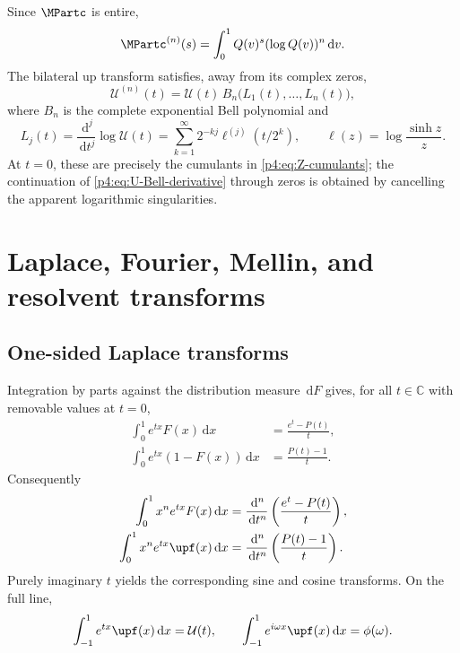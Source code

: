 \documentclass[11pt,oneside]{article}
\theoremstyle{definition}
\theoremstyle{remark}
\newcommand{\F}{F}
\newcommand{\Q}{Q}
\newcommand{\C}{\mathbb C}
\newcommand{\dd}{\,\mathrm d}
\newcommand{\1}{\mathbf 1}
\begin{document}
Since \(\MPartc\) is entire,
\begin{equation}\label{p4:eq:M-nth-derivative}
 \MPartc^{(n)}(s)=\int_0^1\Q(v)^s(\log\Q(v))^n\dd v.
\end{equation}
The bilateral up transform satisfies, away from its complex zeros,
\begin{equation}\label{p4:eq:U-Bell-derivative}
 \mathcal U^{(n)}(t)
 =\mathcal U(t)\,
 B_n\bigl(L_1(t),\ldots,L_n(t)\bigr),
\end{equation}
where \(B_n\) is the complete exponential Bell polynomial and
\begin{equation}\label{p4:eq:Lj-def}
 L_j(t)=\frac{\dd^j}{\dd t^j}\log\mathcal U(t)
 =\sum_{k=1}^{\infty}2^{-kj}
 \ell^{(j)}(t/2^k),
 \qquad \ell(z)=\log\frac{\sinh z}{z}.
\end{equation}
At \(t=0\), these are precisely the cumulants in \cref{p4:eq:Z-cumulants}; the
continuation of \cref{p4:eq:U-Bell-derivative} through zeros is obtained by cancelling the
apparent logarithmic singularities.

\section{Laplace, Fourier, Mellin, and resolvent transforms}

\subsection{One-sided Laplace transforms}

Integration by parts against the distribution measure \(\dd\F\) gives, for all
\(t\in\C\) with removable values at \(t=0\),
\begin{align}
 \int_0^1e^{tx}\F(x)\dd x
 &=\frac{e^t-P(t)}t,
 \label{p4:eq:Laplace-F}\\
 \int_0^1e^{tx}(1-\F(x))\dd x
 &=\frac{P(t)-1}t.
 \label{p4:eq:Laplace-up-half}
\end{align}
Consequently
\begin{align}
 \int_0^1x^ne^{tx}\F(x)\dd x
 &=\frac{\dd^n}{\dd t^n}\left(\frac{e^t-P(t)}t\right),
 \label{p4:eq:exp-poly-F}\\
 \int_0^1x^ne^{tx}\upf(x)\dd x
 &=\frac{\dd^n}{\dd t^n}\left(\frac{P(t)-1}t\right).
 \label{p4:eq:exp-poly-up}
\end{align}
Purely imaginary \(t\) yields the corresponding sine and cosine transforms.  On the
full line,
\begin{equation}\label{p4:eq:bilateral-up-transform}
 \int_{-1}^1e^{tx}\upf(x)\dd x=\mathcal U(t),
 \qquad
 \int_{-1}^1e^{i\omega x}\upf(x)\dd x=\phi(\omega).
\end{equation}
\end{document}
